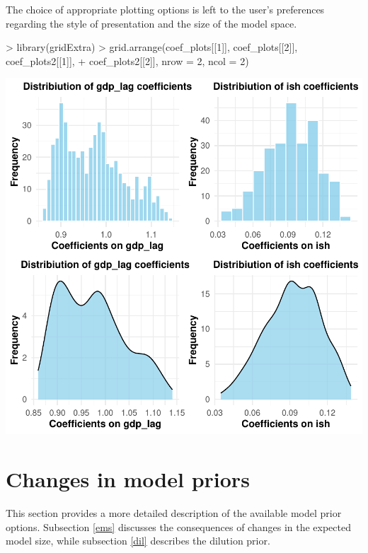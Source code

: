 \documentclass[a4paper]{article}
\begin{document}
The choice of appropriate plotting options is left to the user's preferences regarding the style of presentation and the size of the model space.
\begin{Schunk}
\begin{Sinput}
> library(gridExtra)
> grid.arrange(coef_plots[[1]], coef_plots[[2]], coef_plots2[[1]],
+              coef_plots2[[2]], nrow = 2, ncol = 2)
\end{Sinput}
\end{Schunk}
\includegraphics{bdsm_vignette-025}

\section{Changes in model priors}\label{priors}
This section provides a more detailed description of the available model prior options. Subsection \ref{ems} discusses the consequences of changes in the expected model size, while subsection \ref{dil} describes the dilution prior.
\end{document}
